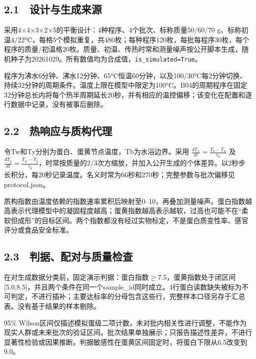 \documentclass[
  chinese,
  a4paper,
  fontset=fandol]{ctexart}
\begin{document}
\FloatBarrier
\subsection{2.1　设计与生成来源}\label{ux8bbeux8ba1ux4e0eux751fux6210ux6765ux6e90}

采用4×4×3×2×5的平衡设计：4种程序、4个批次、标称质量50/60/70
g、标称初温4/22°C，每格5个模拟重复，共480枚；每种程序120枚，每批每程序30枚，每个程序的质量/初温格20枚。质量、初温、传热时常和测量噪声按公开脚本生成，随机种子为20261029。所有数值均为合成值，\texttt{is\_simulated=True}。

程序为沸水6分钟、沸水12分钟、65°C恒温60分钟，以及100/30°C每2分钟切换、持续32分钟的周期条件。温度上限在模型中限定为100°C。B04的周期程序在固定32分钟总长内将每个热半周期延长20秒，并有相应的温控偏移；该变化在配置和逐行数据中记录，没有被事后删除。

\FloatBarrier
\subsection{2.2　热响应与质构代理}\label{ux70edux54cdux5e94ux4e0eux8d28ux6784ux4ee3ux7406}

令Tw和Ty分别为蛋白、蛋黄节点温度，Tb为水浴边界。采用
\(\frac{dT_w}{dt}=\frac{T_b-T_w}{\tau_w}\) 及
\(\frac{dT_y}{dt}=\frac{T_w-T_y}{\tau_y}\)，时常按质量的2/3次方缩放，并加入公开生成的个体差异。以2秒步长积分，每20秒记录温度。名义时常为66秒和270秒；完整参数与批次偏移见protocol.json。

质构指数由温度依赖的指数速率累积后映射至0--10，再叠加测量噪声。蛋白指数越高表示代理模型中的凝固程度越高；蛋黄指数越高表示越软，过高也可能不在``柔软但成形''的目标区间。两个指数都没有经过实物标定，不是蛋白质变性率、感官评分或食品安全标准。

\FloatBarrier
\subsection{2.3　判据、配对与质量检查}\label{ux5224ux636eux914dux5bf9ux4e0eux8d28ux91cfux68c0ux67e5}

在对生成数据分类前，固定演示判据：蛋白指数\ensuremath{\geq}7.5，蛋黄指数处于闭区间{[}5.0,8.5{]}，并且两个条件在同一个sample\_id同时成立。4行蛋白读数缺失被标为不可判定，不进行插补；主要达标率的分母包含这些行，完整样本口径另存于汇总表。没有基于结果的样本剔除。

95\%
Wilson区间仅描述模拟蛋级二项计数，未对批内相关性进行调整，不能作为现实人群或未来批次的验证区间。批次结果单独展示；只报告描述性差异，不进行显著性检验或因果推断。判据敏感性在蛋黄区间固定时，将蛋白下限从6.5改变到9.0。
\end{document}
